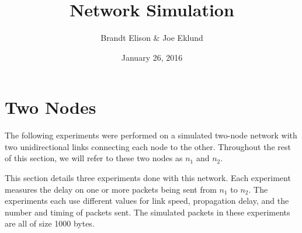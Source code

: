 \documentclass[11pt]{article}
\begin{document}
\lstset{
  language=Python,
  basicstyle=\small,          %
  keywordstyle=\bfseries,
  identifierstyle=,           %
  commentstyle=,              %
  stringstyle=\ttfamily,      %
  showstringspaces=false,     %
  numbers=left,
  numberstyle=\tiny,
  numbersep=5pt,
  frame=tb,
}

\title{Network Simulation}

\author{Brandt Elison & Joe Eklund}

\date{January 26, 2016}

\maketitle

\section{Two Nodes}

The following experiments were performed on a simulated two-node network with two unidirectional links connecting each node to the other. Throughout the rest of this section, we will refer to these two nodes as $n_1$ and $n_2$.

This section details three experiments done with this network. Each experiment measures the delay on one or more packets being sent from $n_1$ to $n_2$. The experiments each use different values for link speed, propagation delay, and the number and timing of packets sent. The simulated packets in these experiments are all of size 1000 bytes.
\end{document}
